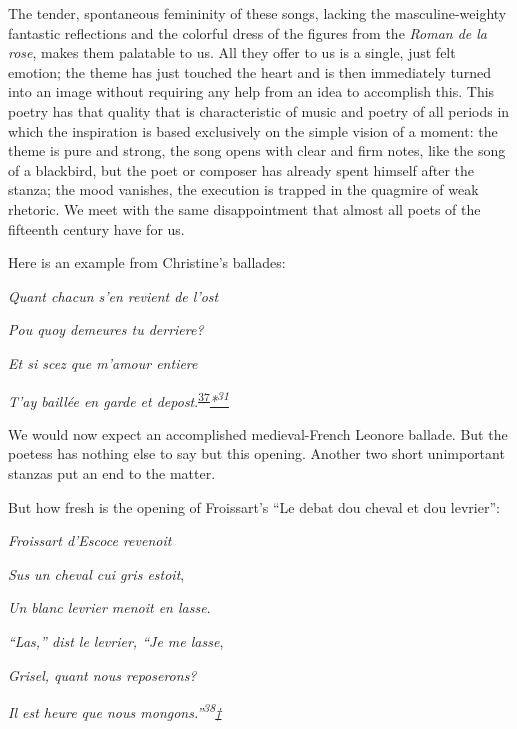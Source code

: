 \protect\hypertarget{21_Chapter_Thirteen__IMAGE_AND_WORD.xhtmlux5cux23page_360}{}{}The
tender, spontaneous femininity of these songs, lacking the
masculine-weighty fantastic reflections and the colorful dress of the
figures from the \emph{Roman de la rose}, makes them palatable to us.
All they offer to us is a single, just felt emotion; the theme has just
touched the heart and is then immediately turned into an image without
requiring any help from an idea to accomplish this. This poetry has that
quality that is characteristic of music and poetry of all periods in
which the inspiration is based exclusively on the simple vision of a
moment: the theme is pure and strong, the song opens with clear and firm
notes, like the song of a blackbird, but the poet or composer has
already spent himself after the stanza; the mood vanishes, the execution
is trapped in the quagmire of weak rhetoric. We meet with the same
disappointment that almost all poets of the fifteenth century have for
us.

Here is an example from Christine's ballades:

\emph{Quant chacun s'en revient de l'ost}

\emph{Pou quoy demeures tu derriere?}

\emph{Et si scez que m'amour entiere}

\emph{T'ay baillée en garde et
depost}.\textsuperscript{\protect\hypertarget{21_Chapter_Thirteen__IMAGE_AND_WORD.xhtmlux5cux23id_236}{\protect\hyperlink{23_NOTES.xhtmlux5cux23id_237}{37}}}\emph{\protect\hypertarget{21_Chapter_Thirteen__IMAGE_AND_WORD.xhtmlux5cux23id_2756}{\protect\hyperlink{23_NOTES.xhtmlux5cux23id_2757}{*\textsuperscript{31}}}}

We would now expect an accomplished medieval-French Leonore ballade. But
the poetess has nothing else to say but this opening. Another two short
unimportant stanzas put an end to the matter.

But how fresh is the opening of Froissart's ``Le debat dou cheval et dou
levrier'':

\emph{Froissart d'Escoce revenoit}

\emph{Sus un cheval cui gris estoit},

\emph{Un blanc levrier menoit en lasse}.

\emph{``Las,'' dist le levrier, ``Je me lasse},

\emph{Grisel, quant nous reposerons?}

\emph{Il est heure que nous
mongons.''\textsuperscript{38}\protect\hypertarget{21_Chapter_Thirteen__IMAGE_AND_WORD.xhtmlux5cux23id_2755}{\protect\hyperlink{23_NOTES.xhtmlux5cux23id_2758}{†\textsuperscript{}}}}

